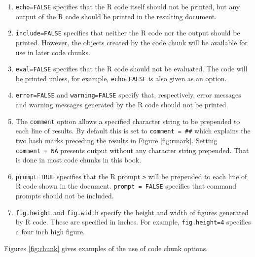 \documentclass[]{krantz}
\theoremstyle{definition}
\theoremstyle{definition}
\theoremstyle{definition}
\theoremstyle{remark}
\begin{document}
\begin{enumerate}
\def\labelenumi{\arabic{enumi}.}
\item
  \texttt{echo=FALSE} specifies that the R code itself should not be
  printed, but any output of the R code should be printed in the
  resulting document.
\item
  \texttt{include=FALSE} specifies that neither the R code nor the
  output should be printed. However, the objects created by the code
  chunk will be available for use in later code chunks.
\item
  \texttt{eval=FALSE} specifies that the R code should not be evaluated.
  The code will be printed unless, for example, \texttt{echo=FALSE} is
  also given as an option.
\item
  \texttt{error=FALSE} and \texttt{warning=FALSE} specify that,
  respectively, error messages and warning messages generated by the R
  code should not be printed.
\item
  The \texttt{comment} option allows a specified character string to be
  prepended to each line of results. By default this is set to
  \texttt{comment\ =\ \textquotesingle{}\#\#\textquotesingle{}} which
  explains the two hash marks preceding the results in Figure
  \ref{fig:rmark}. Setting \texttt{comment\ =\ NA} presents output
  without any character string prepended. That is done in most code
  chunks in this book.
\item
  \texttt{prompt=TRUE} specifies that the R prompt
  \texttt{\textgreater{}} will be prepended to each line of R code shown
  in the document. \texttt{prompt\ =\ FALSE} specifies that command
  prompts should not be included.
\item
  \texttt{fig.height} and \texttt{fig.width} specify the height and
  width of figures generated by R code. These are specified in inches.
  For example, \texttt{fig.height=4} specifies a four inch high figure.
\end{enumerate}

Figures \ref{fig:chunk} gives examples of the use of code chunk options.
\end{document}
